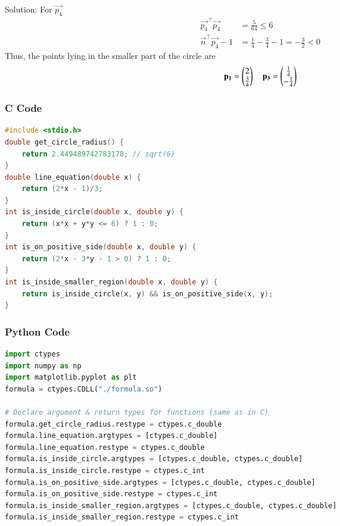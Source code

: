 \documentclass{beamer}
\begin{document}
\begin{frame}{Solution:}
For $\vec{p_4}$
\begin{align}
\vec{p_4}^\top \vec{p_4} &= \frac{5}{64} \leq 6\\
\vec{n}^\top \vec{p_4} - 1 &= \frac{1}{4} - \frac{3}{4} - 1 = -\frac{3}{2} < 0
\end{align}
Thus, the points lying in the smaller part of the circle are
\begin{align}
    \mathbf{p_1} = \begin{pmatrix}2\\ \frac{3}{4}\end{pmatrix} \quad \mathbf{p_3} = \begin{pmatrix}\frac{1}{4}\\ -\frac{1}{4}\end{pmatrix}
\end{align}
\end{frame}



\begin{frame}[fragile]
  \frametitle{C Code}
  \begin{lstlisting}[language=C]
#include <stdio.h>
double get_circle_radius() {
    return 2.449489742783178; // sqrt(6)
}
double line_equation(double x) {
    return (2*x - 1)/3;
}
int is_inside_circle(double x, double y) {
    return (x*x + y*y <= 6) ? 1 : 0;
}
int is_on_positive_side(double x, double y) {
    return (2*x - 3*y - 1 > 0) ? 1 : 0;
}
int is_inside_smaller_region(double x, double y) {
    return is_inside_circle(x, y) && is_on_positive_side(x, y);
}
  \end{lstlisting}
\end{frame}

\begin{frame}[fragile]
  \frametitle{Python Code}
  \begin{lstlisting}[language=Python]
import ctypes
import numpy as np
import matplotlib.pyplot as plt
formula = ctypes.CDLL("./formula.so")

# Declare argument & return types for functions (same as in C)
formula.get_circle_radius.restype = ctypes.c_double
formula.line_equation.argtypes = [ctypes.c_double]
formula.line_equation.restype = ctypes.c_double
formula.is_inside_circle.argtypes = [ctypes.c_double, ctypes.c_double]
formula.is_inside_circle.restype = ctypes.c_int
formula.is_on_positive_side.argtypes = [ctypes.c_double, ctypes.c_double]
formula.is_on_positive_side.restype = ctypes.c_int
formula.is_inside_smaller_region.argtypes = [ctypes.c_double, ctypes.c_double]
formula.is_inside_smaller_region.restype = ctypes.c_int
  \end{lstlisting}
\end{frame}
\end{document}

